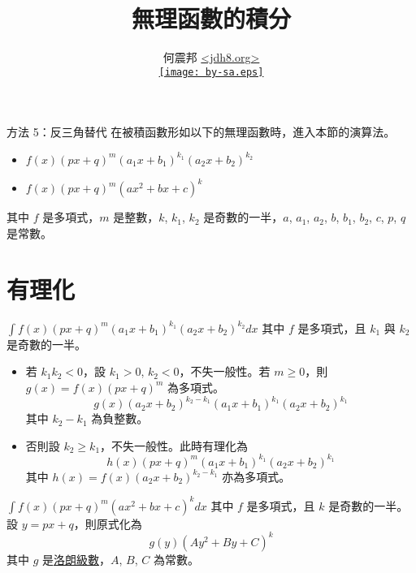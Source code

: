 \documentclass{beamer}
\title[積分無理函數]{無理函數的積分}
\author[何震邦]{何震邦 \href{http://jdh8.org/}{\textless jdh8.org\textgreater}\\
    \href{http://creativecommons.org/licenses/by-sa/3.0/tw/deed.zh\textunderscore TW}{\texttt{[image: by-sa.eps]}}}
\theoremstyle{remark}
\begin{document}
\begin{CJK}{UTF8}{bsmi}
\maketitle

\begin{frame}{方法 5：反三角替代}
  在被積函數形如以下的無理函數時，進入本節的演算法。
  \begin{itemize}
    \item $f(x) \left( px + q \right)^m \left( a_1 x + b_1 \right)^{k_1} \left( a_2 x + b_2 \right)^{k_2}$
    \item $f(x) \left( px + q \right)^m \left( ax^2 + bx + c \right)^k$
  \end{itemize}
  其中 $f$ 是多項式，$m$ 是整數，$k$, $k_1$, $k_2$ 是奇數的一半，$a$, $a_1$, $a_2$, $b$, $b_1$, $b_2$, $c$, $p$, $q$
  是常數。
\end{frame}

\section{有理化}
\begin{frame}{$\displaystyle \int f(x) \left( px + q \right)^m \left( a_1 x + b_1 \right)^{k_1}
    \left( a_2 x + b_2 \right)^{k_2} dx$}
  其中 $f$ 是多項式，且 $k_1$ 與 $k_2$ 是奇數的一半。
  \begin{itemize}
    \item 若 $k_1 k_2 < 0$，設 $k_1 > 0$, $k_2 < 0$，不失一般性。若 $m \ge 0$，則 $g(x) = f(x) \left( px + q \right)^m$
      為多項式。
      \[g(x) \left( a_2 x + b_2 \right)^{k_2 - k_1} \left( a_1 x + b_1 \right)^{k_1} \left( a_2 x + b_2 \right)^{k_1}\]
      其中 $k_2 - k_1$ 為負整數。
    \item 否則設 $k_2 \ge k_1$，不失一般性。此時有理化為
      \[h(x) \left( px + q \right)^m \left( a_1 x + b_1 \right)^{k_1} \left( a_2 x + b_2 \right)^{k_1}\]
      其中 $h(x) = f(x)  \left( a_2 x + b_2 \right)^{k_2-k_1}$ 亦為多項式。
  \end{itemize}
\end{frame}

\begin{frame}{$\displaystyle \int f(x) \left( px + q \right)^m \left( ax^2 + bx + c \right)^k dx$}
  其中 $f$ 是多項式，且 $k$ 是奇數的一半。設 $y = px + q$，則原式化為
  \[g(y) \left( Ay^2 + By + C \right)^k\]
  其中 $g$ 是\href{http://zh.wikipedia.org/wiki/\%E6\%B4\%9B\%E6\%9C\%97\%E7\%BA\%A7\%E6\%95\%B0}{洛朗級數}，$A$, $B$, $C$
  為常數。
\end{frame}


\end{CJK}
\end{document}

